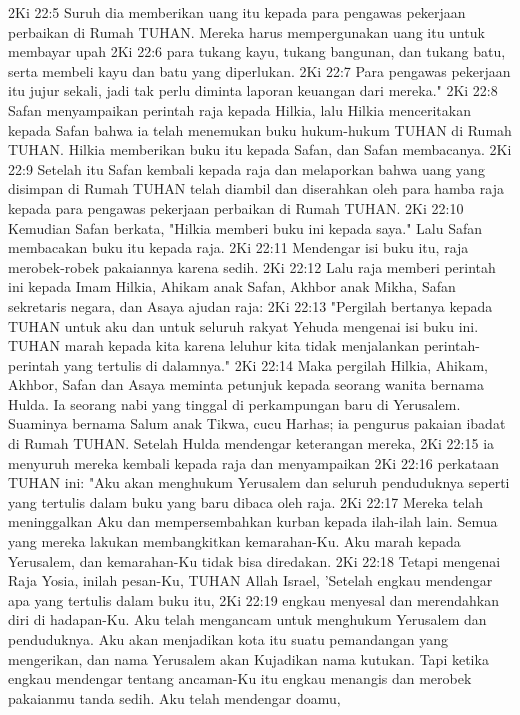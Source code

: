 2Ki 22:5  Suruh dia memberikan uang itu kepada para pengawas pekerjaan perbaikan di Rumah TUHAN. Mereka harus mempergunakan uang itu untuk membayar upah
2Ki 22:6  para tukang kayu, tukang bangunan, dan tukang batu, serta membeli kayu dan batu yang diperlukan.
2Ki 22:7  Para pengawas pekerjaan itu jujur sekali, jadi tak perlu diminta laporan keuangan dari mereka."
2Ki 22:8  Safan menyampaikan perintah raja kepada Hilkia, lalu Hilkia menceritakan kepada Safan bahwa ia telah menemukan buku hukum-hukum TUHAN di Rumah TUHAN. Hilkia memberikan buku itu kepada Safan, dan Safan membacanya.
2Ki 22:9  Setelah itu Safan kembali kepada raja dan melaporkan bahwa uang yang disimpan di Rumah TUHAN telah diambil dan diserahkan oleh para hamba raja kepada para pengawas pekerjaan perbaikan di Rumah TUHAN.
2Ki 22:10  Kemudian Safan berkata, "Hilkia memberi buku ini kepada saya." Lalu Safan membacakan buku itu kepada raja.
2Ki 22:11  Mendengar isi buku itu, raja merobek-robek pakaiannya karena sedih.
2Ki 22:12  Lalu raja memberi perintah ini kepada Imam Hilkia, Ahikam anak Safan, Akhbor anak Mikha, Safan sekretaris negara, dan Asaya ajudan raja:
2Ki 22:13  "Pergilah bertanya kepada TUHAN untuk aku dan untuk seluruh rakyat Yehuda mengenai isi buku ini. TUHAN marah kepada kita karena leluhur kita tidak menjalankan perintah-perintah yang tertulis di dalamnya."
2Ki 22:14  Maka pergilah Hilkia, Ahikam, Akhbor, Safan dan Asaya meminta petunjuk kepada seorang wanita bernama Hulda. Ia seorang nabi yang tinggal di perkampungan baru di Yerusalem. Suaminya bernama Salum anak Tikwa, cucu Harhas; ia pengurus pakaian ibadat di Rumah TUHAN. Setelah Hulda mendengar keterangan mereka,
2Ki 22:15  ia menyuruh mereka kembali kepada raja dan menyampaikan
2Ki 22:16  perkataan TUHAN ini: "Aku akan menghukum Yerusalem dan seluruh penduduknya seperti yang tertulis dalam buku yang baru dibaca oleh raja.
2Ki 22:17  Mereka telah meninggalkan Aku dan mempersembahkan kurban kepada ilah-ilah lain. Semua yang mereka lakukan membangkitkan kemarahan-Ku. Aku marah kepada Yerusalem, dan kemarahan-Ku tidak bisa diredakan.
2Ki 22:18  Tetapi mengenai Raja Yosia, inilah pesan-Ku, TUHAN Allah Israel, 'Setelah engkau mendengar apa yang tertulis dalam buku itu,
2Ki 22:19  engkau menyesal dan merendahkan diri di hadapan-Ku. Aku telah mengancam untuk menghukum Yerusalem dan penduduknya. Aku akan menjadikan kota itu suatu pemandangan yang mengerikan, dan nama Yerusalem akan Kujadikan nama kutukan. Tapi ketika engkau mendengar tentang ancaman-Ku itu engkau menangis dan merobek pakaianmu tanda sedih. Aku telah mendengar doamu,
